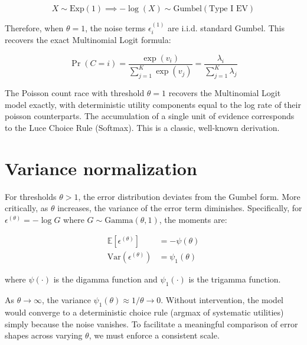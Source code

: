 \documentclass[
  man,
  floatsintext,
  longtable,
  a4paper,
  nolmodern,
  notxfonts,
  notimes,
  colorlinks=true,linkcolor=blue,citecolor=blue,urlcolor=blue]{apa7}
\begin{document}
\[
X \sim \text{Exp}(1) \implies -\log(X) \sim \text{Gumbel}(\text{Type I EV})
\]

Therefore, when \(\theta=1\), the noise terms \(\epsilon_i^{(1)}\) are
i.i.d. standard Gumbel. This recovers the exact Multinomial Logit
formula:

\[
\Pr(C=i) = \frac{\exp(v_i)}{\sum_{j=1}^K \exp(v_j)} = \frac{\lambda_i}{\sum_{j=1}^K \lambda_j}
\]

\begin{tcolorbox}[enhanced jigsaw, colbacktitle=quarto-callout-note-color!10!white, bottomtitle=1mm, colback=white, arc=.35mm, coltitle=black, bottomrule=.15mm, breakable, toptitle=1mm, titlerule=0mm, colframe=quarto-callout-note-color-frame, toprule=.15mm, title={Result 2 (Logit Boundary)}, rightrule=.15mm, left=2mm, leftrule=.75mm, opacityback=0, opacitybacktitle=0.6]

The Poisson count race with threshold \(\theta=1\) recovers the
Multinomial Logit model exactly, with deterministic utility components
equal to the log rate of their poisson counterparts. The accumulation of
a single unit of evidence corresponds to the Luce Choice Rule (Softmax).
This is a classic, well-known derivation.

\end{tcolorbox}

\section{Variance normalization}\label{variance-normalization}

For thresholds \(\theta > 1\), the error distribution deviates from the
Gumbel form. More critically, as \(\theta\) increases, the variance of
the error term diminishes. Specifically, for
\(\epsilon^{(\theta)} = -\log G\) where
\(G \sim \text{Gamma}(\theta, 1)\), the moments are:

\[
\begin{aligned} \mathbb{E}[\epsilon^{(\theta)}] &= -\psi(\theta) \\ \text{Var}(\epsilon^{(\theta)}) &= \psi_1(\theta) \end{aligned}
\]

where \(\psi(\cdot)\) is the digamma function and \(\psi_1(\cdot)\) is
the trigamma function.

As \(\theta \to \infty\), the variance
\(\psi_1(\theta) \approx 1/\theta \to 0\). Without intervention, the
model would converge to a deterministic choice rule (argmax of
systematic utilities) simply because the noise vanishes. To facilitate a
meaningful comparison of error shapes across varying \(\theta\), we must
enforce a consistent scale.
\end{document}

